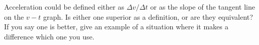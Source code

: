 Acceleration could be defined either as
 $\Delta v/\Delta t$ or as the slope of the tangent line on the $v-t$ graph.
Is either one superior as a definition, or are they
equivalent? If you say one is better, give an example of a
situation where it makes a difference which one you use.
